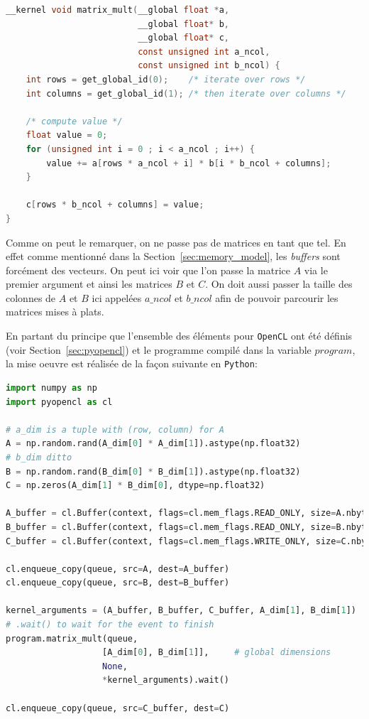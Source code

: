\begin{lstlisting}[language=c]
__kernel void matrix_mult(__global float *a,
                          __global float* b,
                          __global float* c,
                          const unsigned int a_ncol,
                          const unsigned int b_ncol) {
    int rows = get_global_id(0);    /* iterate over rows */
    int columns = get_global_id(1); /* then iterate over columns */

    /* compute value */
    float value = 0;
    for (unsigned int i = 0 ; i < a_ncol ; i++) {
        value += a[rows * a_ncol + i] * b[i * b_ncol + columns];
    }

    c[rows * b_ncol + columns] = value;
}
\end{lstlisting}    
\vspace{20pt}

Comme on peut le remarquer, on ne passe pas de matrices en tant que tel. En effet 
comme mentionné dans la Section~\ref{sec:memory_model}, les \textit{buffers} sont 
forcément des vecteurs. On peut ici voir que l'on passe la matrice $A$ via le 
premier argument et ainsi les matrices $B$ et $C$. On doit aussi passer la taille 
des colonnes de $A$ et $B$ ici appelées $a\_ncol$ et $b\_ncol$ afin de pouvoir 
parcourir les matrices mises à plats.

En partant du principe que l'ensemble des éléments pour \texttt{OpenCL} ont été 
définis (voir Section~\ref{sec:pyopencl}) et le programme compilé dans la variable 
$program$, la mise oeuvre est réalisée de la façon suivante en \texttt{Python}:
\begin{lstlisting}[language=python]
import numpy as np
import pyopencl as cl

# a_dim is a tuple with (row, column) for A
A = np.random.rand(A_dim[0] * A_dim[1]).astype(np.float32)   
# b_dim ditto
B = np.random.rand(B_dim[0] * B_dim[1]).astype(np.float32)   
C = np.zeros(A_dim[1] * B_dim[0], dtype=np.float32)

A_buffer = cl.Buffer(context, flags=cl.mem_flags.READ_ONLY, size=A.nbytes)
B_buffer = cl.Buffer(context, flags=cl.mem_flags.READ_ONLY, size=B.nbytes)
C_buffer = cl.Buffer(context, flags=cl.mem_flags.WRITE_ONLY, size=C.nbytes)

cl.enqueue_copy(queue, src=A, dest=A_buffer)
cl.enqueue_copy(queue, src=B, dest=B_buffer)

kernel_arguments = (A_buffer, B_buffer, C_buffer, A_dim[1], B_dim[1])
# .wait() to wait for the event to finish
program.matrix_mult(queue, 
                   [A_dim[0], B_dim[1]],     # global dimensions
                   None, 
                   *kernel_arguments).wait()

cl.enqueue_copy(queue, src=C_buffer, dest=C)
\end{lstlisting}
\vspace{20pt}

